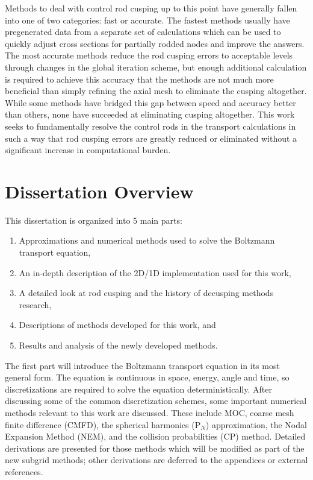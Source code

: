 Methods to deal with control rod cusping up to this point have generally fallen into one of two categories: fast or accurate.  The fastest methods usually have pregenerated data from a separate set of calculations which can be used to quickly adjust cross sections for partially rodded nodes and improve the answers.  The most accurate methods reduce the rod cusping errors to acceptable levels through changes in the global iteration scheme, but enough additional calculation is required to achieve this accuracy that the methods are not much more beneficial than simply refining the axial mesh to eliminate the cusping altogether.  While some methods have bridged this gap between speed and accuracy better than others, none have succeeded at eliminating cusping altogether.  This work seeks to fundamentally resolve the control rods in the transport calculations in such a way that rod cusping errors are greatly reduced or eliminated without a significant increase in computational burden.

\section{Dissertation Overview}

This dissertation is organized into 5 main parts:

\begin{enumerate}
    \item Approximations and numerical methods used to solve the Boltzmann transport equation,
    \item An in-depth description of the 2D/1D implementation used for this work,
    \item A detailed look at rod cusping and the history of decusping methods research,
    \item Descriptions of methods developed for this work, and
    \item Results and analysis of the newly developed methods.
\end{enumerate}

The first part will introduce the Boltzmann transport equation in its most general form.  The equation is continuous in space, energy, angle and time, so discretizations are required to solve the equation deterministically.  After discussing some of the common discretization schemes, some important numerical methods relevant to this work are discussed.  These include MOC, coarse mesh finite difference (CMFD), the spherical harmonics (P$_N$) approximation, the Nodal Expansion Method (NEM), and the collision probabilities (CP) method.  Detailed derivations are presented for those methods which will be modified as part of the new subgrid methods; other derivations are deferred to the appendices or external references.

